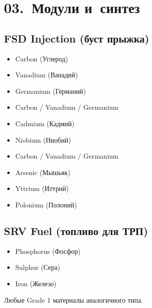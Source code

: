 \hypertarget{ch03}{}
\section{03.~Модули и~синтез}

\subsection{FSD Injection (буст прыжка)}

\begin{tcolorbox}[edbox-blue, title=BASIC +25\%]
\begin{itemize}
\item Carbon (Углерод)
\item Vanadium (Ванадий)
\item Germanium (Германий)
\end{itemize}
\end{tcolorbox}

\begin{tcolorbox}[edbox-blue, title=STANDARD +50\%]
\begin{itemize}
\item Carbon / Vanadium / Germanium
\item Cadmium (Кадмий)
\item Niobium (Ниобий)
\end{itemize}
\end{tcolorbox}

\begin{tcolorbox}[edbox-blue, title=PREMIUM +100\%]
\begin{itemize}
\item Carbon / Vanadium / Germanium
\item Arsenic (Мышьяк)
\item Yttrium (Иттрий)
\item Polonium (Полоний)
\end{itemize}
\end{tcolorbox}

\edsep

\subsection{SRV Fuel (топливо для ТРП)}

\begin{tcolorbox}[edbox-titled, title=БАЗОВЫЙ РЕЦЕПТ]
\begin{itemize}
\item Phosphorus (Фосфор)
\item Sulphur (Сера)
\item Iron (Железо)
\end{itemize}
{\color{edgraytext}\fontsize{6}{7}\selectfont
  Любые Grade 1 материалы аналогичного типа.}
\end{tcolorbox}


